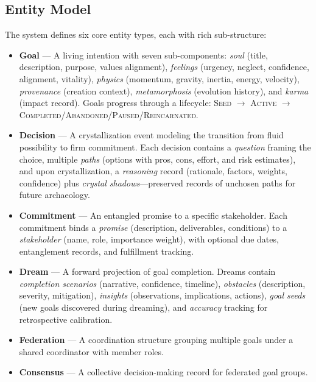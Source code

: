 \documentclass[10pt, twocolumn]{article}
\begin{document}
\subsection{Entity Model}
\label{sec:entities}

The system defines six core entity types, each with rich sub-structure:

\begin{itemize}[nosep, leftmargin=*]
  \item \textbf{Goal} --- A living intention with seven sub-components: \emph{soul} (title, description, purpose, values alignment), \emph{feelings} (urgency, neglect, confidence, alignment, vitality), \emph{physics} (momentum, gravity, inertia, energy, velocity), \emph{provenance} (creation context), \emph{metamorphosis} (evolution history), and \emph{karma} (impact record). Goals progress through a lifecycle: \textsc{Seed} $\to$ \textsc{Active} $\to$ \textsc{Completed}/\textsc{Abandoned}/\textsc{Paused}/\textsc{Reincarnated}.
  \item \textbf{Decision} --- A crystallization event modeling the transition from fluid possibility to firm commitment. Each decision contains a \emph{question} framing the choice, multiple \emph{paths} (options with pros, cons, effort, and risk estimates), and upon crystallization, a \emph{reasoning} record (rationale, factors, weights, confidence) plus \emph{crystal shadows}---preserved records of unchosen paths for future archaeology.
  \item \textbf{Commitment} --- An entangled promise to a specific stakeholder. Each commitment binds a \emph{promise} (description, deliverables, conditions) to a \emph{stakeholder} (name, role, importance weight), with optional due dates, entanglement records, and fulfillment tracking.
  \item \textbf{Dream} --- A forward projection of goal completion. Dreams contain \emph{completion scenarios} (narrative, confidence, timeline), \emph{obstacles} (description, severity, mitigation), \emph{insights} (observations, implications, actions), \emph{goal seeds} (new goals discovered during dreaming), and \emph{accuracy} tracking for retrospective calibration.
  \item \textbf{Federation} --- A coordination structure grouping multiple goals under a shared coordinator with member roles.
  \item \textbf{Consensus} --- A collective decision-making record for federated goal groups.
\end{itemize}
\end{document}
